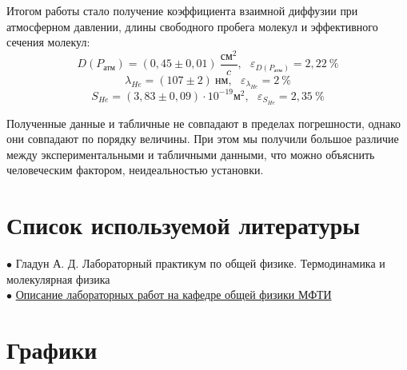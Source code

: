 Итогом работы стало получение коэффициента взаимной диффузии при атмосферном давлении, длины свободного пробега  молекул и эффективного сечения молекул:
\[D(P_{\text{атм}}) = (0,45 \pm 0,01)\ \frac{\text{см}^2}{c}, \ ~ \ \varepsilon_{D(P_{\text{атм}})} = 2,22\ \% \]
\[\lambda_{He} = (107 \pm 2)\ \text{нм}, \ ~ \ \varepsilon_{\lambda_{He}} = 2\ \%\]
\[S_{He} = (3,83 \pm 0,09) \cdot 10^{-19} \text{м}^2,\ ~ \  \varepsilon_{S_{He}} = 2,35\ \% \]
 
 
Полученные данные и табличные не совпадают в пределах погрешности, однако они совпадают по порядку величины. При этом мы получили большое различие между экспериментальными и табличными данными, что можно объяснить человеческим фактором, неидеальностью установки.


\section{Список используемой литературы}

$\bullet$ Гладун А. Д. Лабораторный практикум по общей физике. Термодинамика и молекулярная физика\\

$\bullet$ \href{https://mipt.ru/education/chair/physics/S_II/lab/}{Описание лабораторных работ на кафедре общей физики МФТИ}

\newpage

\section{Графики}

